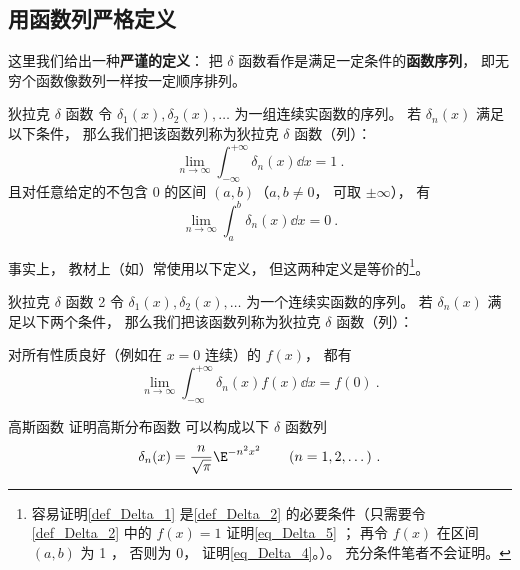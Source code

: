\subsection{用函数列严格定义}

这里我们给出一种\textbf{严谨的定义}： 把 $\delta$ 函数看作是满足一定条件的\textbf{函数序列}， 即无穷个函数像数列一样按一定顺序排列。
\begin{definition}{狄拉克 $\delta$ 函数}\label{def_Delta_1}
令 $\delta_1(x), \delta_2(x), \dots$ 为一组连续实函数的序列。 若 $\delta_n(x)$ 满足以下条件， 那么我们把该函数列称为狄拉克 $\delta$ 函数（列）：
\begin{equation}\label{eq_Delta_5}
\lim_{n\to\infty}\int_{-\infty}^{+\infty} \delta_n(x) \dd{x} = 1~.
\end{equation}
且对任意给定的不包含 0 的区间 $(a,b)$（$a,b \ne 0$， 可取 $\pm\infty$）， 有
\begin{equation}\label{eq_Delta_4}
\lim_{n\to\infty} \int_{a}^{b} \delta_n(x) \dd{x} = 0~.
\end{equation}
\end{definition}
事实上， 教材上（如\cite{Arfken}）常使用以下定义， 但这两种定义是等价的\footnote{容易证明\autoref{def_Delta_1} 是\autoref{def_Delta_2} 的必要条件（只需要令\autoref{def_Delta_2} 中的 $f(x) = 1$ 证明\autoref{eq_Delta_5} ； 再令 $f(x)$ 在区间 $(a,b)$ 为 1 ， 否则为 0， 证明\autoref{eq_Delta_4}。）。 充分条件笔者不会证明。}。

\begin{definition}{狄拉克 $\delta$ 函数 2}\label{def_Delta_2}
令 $\delta_1(x), \delta_2(x), \dots$ 为一个连续实函数的序列。 若 $\delta_n(x)$ 满足以下两个条件， 那么我们把该函数列称为狄拉克 $\delta$ 函数（列）：

对所有性质良好（例如在 $x = 0$ 连续）的 $f(x)$， 都有
\begin{equation}
\lim_{n\to\infty}\int_{-\infty}^{+\infty} \delta_n(x)f(x) \dd{x} = f(0)~.
\end{equation}
\end{definition}

\begin{exercise}{高斯函数}\label{exe_Delta_2}
证明高斯分布函数 可以构成以下 $\delta$ 函数列
\begin{equation}
\delta_n(x) = \frac{n}{\sqrt{\pi}} \E^{-{n ^2}x^2} \qquad (n = 1, 2, \dots)~.
\end{equation}
\end{exercise}

